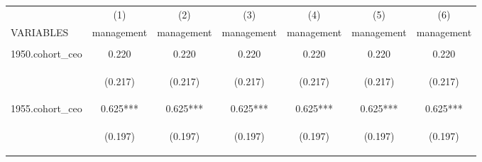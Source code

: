 \begin{center}
\begin{tabular}{lcccccc} \hline
 & (1) & (2) & (3) & (4) & (5) & (6) \\
VARIABLES & management & management & management & management & management & management \\ \hline
\vspace{4pt} & \begin{footnotesize}\end{footnotesize} & \begin{footnotesize}\end{footnotesize} & \begin{footnotesize}\end{footnotesize} & \begin{footnotesize}\end{footnotesize} & \begin{footnotesize}\end{footnotesize} & \begin{footnotesize}\end{footnotesize} \\
1950.cohort\_ceo & 0.220 & 0.220 & 0.220 & 0.220 & 0.220 & 0.220 \\
\vspace{4pt} & \begin{footnotesize}(0.217)\end{footnotesize} & \begin{footnotesize}(0.217)\end{footnotesize} & \begin{footnotesize}(0.217)\end{footnotesize} & \begin{footnotesize}(0.217)\end{footnotesize} & \begin{footnotesize}(0.217)\end{footnotesize} & \begin{footnotesize}(0.217)\end{footnotesize} \\
1955.cohort\_ceo & 0.625*** & 0.625*** & 0.625*** & 0.625*** & 0.625*** & 0.625*** \\
\vspace{4pt} & \begin{footnotesize}(0.197)\end{footnotesize} & \begin{footnotesize}(0.197)\end{footnotesize} & \begin{footnotesize}(0.197)\end{footnotesize} & \begin{footnotesize}(0.197)\end{footnotesize} & \begin{footnotesize}(0.197)\end{footnotesize} & \begin{footnotesize}(0.197)\end{footnotesize} \\

\end{tabular}
\end{center}
